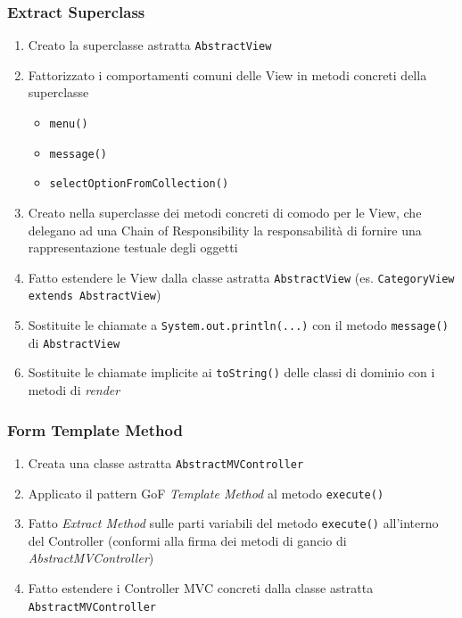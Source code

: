 \begin{frame}
    \frametitle{Extract Superclass}
    \begin{enumerate}
        \item Creato la superclasse astratta \texttt{AbstractView}
        \item Fattorizzato i comportamenti comuni delle View in metodi concreti della superclasse
          \begin{itemize}
              \item \texttt{menu()}
              \item \texttt{message()}
              \item \texttt{selectOptionFromCollection()}
          \end{itemize}
        \item Creato nella superclasse dei metodi concreti di comodo per le View, che delegano ad una Chain of Responsibility la responsabilità
              di fornire una rappresentazione testuale degli oggetti
        \item Fatto estendere le View dalla classe astratta \texttt{AbstractView} (es. \texttt{CategoryView extends AbstractView})
        \item Sostituite le chiamate a \texttt{System.out.println(...)} con il metodo \texttt{message()} di \texttt{AbstractView}
        \item Sostituite le chiamate implicite ai \texttt{toString()} delle classi di dominio con i metodi di \emph{render}
    \end{enumerate}
\end{frame}

\begin{frame}
    \frametitle{Form Template Method}
    \begin{enumerate}
        \item Creata una classe astratta \texttt{AbstractMVController}
        \item Applicato il pattern GoF \emph{Template Method} al metodo \texttt{execute()}
        \item Fatto \emph{Extract Method} sulle parti variabili del metodo \texttt{execute()} all'interno del Controller (conformi alla firma dei metodi di gancio di \emph{AbstractMVController})
        \item Fatto estendere i Controller MVC concreti dalla classe astratta \texttt{AbstractMVController}
    \end{enumerate}
\end{frame}

